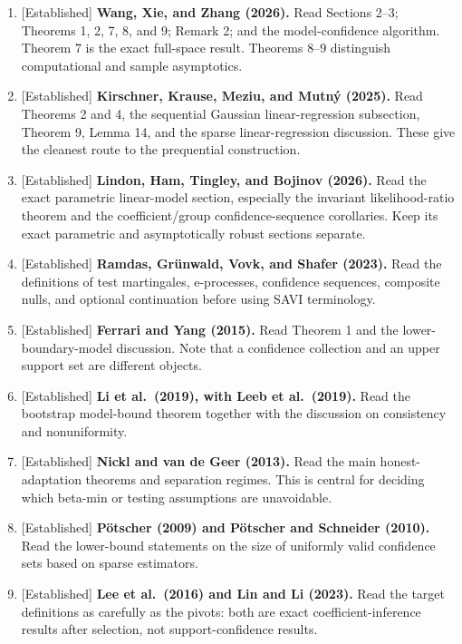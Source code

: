 \documentclass[
  english,
  11pt,
  a4paper,
]{article}
\providecommand{\tightlist}{%
  \setlength{\itemsep}{0pt}\setlength{\parskip}{0pt}}
\begin{document}
\begin{enumerate}
\def\labelenumi{\arabic{enumi}.}
\tightlist
\item
  {[}Established{]} \textbf{Wang, Xie, and Zhang (2026).} Read Sections
  2--3; Theorems 1, 2, 7, 8, and 9; Remark 2; and the model-confidence
  algorithm. Theorem 7 is the exact full-space result. Theorems 8--9
  distinguish computational and sample asymptotics.
\item
  {[}Established{]} \textbf{Kirschner, Krause, Meziu, and Mutný (2025).}
  Read Theorems 2 and 4, the sequential Gaussian linear-regression
  subsection, Theorem 9, Lemma 14, and the sparse linear-regression
  discussion. These give the cleanest route to the prequential
  construction.
\item
  {[}Established{]} \textbf{Lindon, Ham, Tingley, and Bojinov (2026).}
  Read the exact parametric linear-model section, especially the
  invariant likelihood-ratio theorem and the coefficient/group
  confidence-sequence corollaries. Keep its exact parametric and
  asymptotically robust sections separate.
\item
  {[}Established{]} \textbf{Ramdas, Grünwald, Vovk, and Shafer (2023).}
  Read the definitions of test martingales, e-processes, confidence
  sequences, composite nulls, and optional continuation before using
  SAVI terminology.
\item
  {[}Established{]} \textbf{Ferrari and Yang (2015).} Read Theorem 1 and
  the lower-boundary-model discussion. Note that a confidence collection
  and an upper support set are different objects.
\item
  {[}Established{]} \textbf{Li et al.~(2019), with Leeb et al.~(2019).}
  Read the bootstrap model-bound theorem together with the discussion on
  consistency and nonuniformity.
\item
  {[}Established{]} \textbf{Nickl and van de Geer (2013).} Read the main
  honest-adaptation theorems and separation regimes. This is central for
  deciding which beta-min or testing assumptions are unavoidable.
\item
  {[}Established{]} \textbf{Pötscher (2009) and Pötscher and Schneider
  (2010).} Read the lower-bound statements on the size of uniformly
  valid confidence sets based on sparse estimators.
\item
  {[}Established{]} \textbf{Lee et al.~(2016) and Lin and Li (2023).}
  Read the target definitions as carefully as the pivots: both are exact
  coefficient-inference results after selection, not support-confidence
  results.

\end{enumerate}
\end{document}
